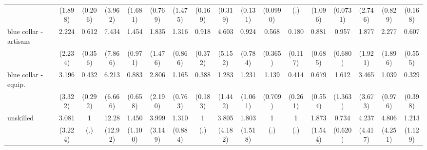 {\begin{tabular}{l*{16}{c}}
                    &     (1.898)         &     (0.206)         &     (3.962)         &     (1.681)         &     (0.769)         &     (1.475)         &     (0.169)         &     (0.319)         &     (0.131)         &    (0.0990)         &         (.)         &     (1.096)         &    (0.0731)         &     (2.746)         &     (0.829)         &     (0.168)         \\
[1em]
blue collar - artisans&       2.224         &       0.612         &       7.434         &       1.454         &       1.835         &       1.316         &       0.918         &       4.603         &       0.924         &       0.568         &       0.180\sym{**} &       0.881         &       0.957         &       1.877         &       2.277         &       0.607         \\
                    &     (2.234)         &     (0.356)         &     (7.866)         &     (0.971)         &     (1.476)         &     (0.866)         &     (0.372)         &     (5.152)         &     (0.784)         &     (0.365)         &     (0.117)         &     (0.685)         &     (0.680)         &     (1.921)         &     (1.896)         &     (0.555)         \\
[1em]
blue collar - equip.&       3.196         &       0.432         &       6.213         &       0.883         &       2.806         &       1.165         &       0.388\sym{*}  &       1.283         &       1.231         &       1.139         &       0.414         &       0.679         &       1.612         &       3.465         &       1.039         &       0.329         \\
                    &     (3.322)         &     (0.292)         &     (6.666)         &     (0.658)         &     (2.190)         &     (0.763)         &     (0.183)         &     (1.442)         &     (1.061)         &     (0.709)         &     (0.261)         &     (0.554)         &     (1.363)         &     (3.673)         &     (0.976)         &     (0.398)         \\
[1em]
unskilled           &       3.081         &           1         &       12.28\sym{*}  &       1.450         &       3.999         &       1.310         &           1         &       3.805         &       1.803         &           1         &           1         &       1.873         &       0.734         &       4.237         &       4.806         &       1.213         \\
                    &     (3.224)         &         (.)         &     (12.92)         &     (1.100)         &     (3.149)         &     (0.884)         &         (.)         &     (4.182)         &     (1.518)         &         (.)         &         (.)         &     (1.544)         &     (0.620)         &     (4.417)         &     (4.251)         &     (1.129)         \\

\end{tabular}}
